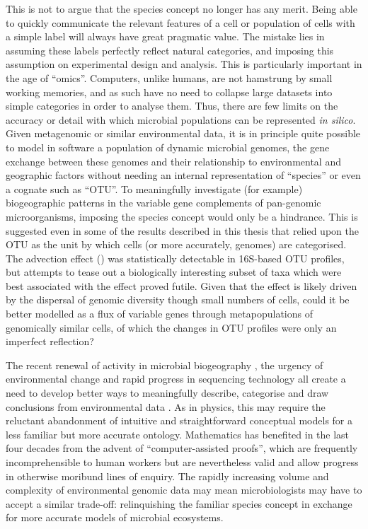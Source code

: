This is not to argue that the species concept no longer has any merit.
Being able to quickly communicate the relevant features of a cell or population of cells with a simple label will always have great pragmatic value.
The mistake lies in assuming these labels perfectly reflect natural categories, and imposing this assumption on experimental design and analysis.
This is particularly important in the age of ``omics''.
Computers, unlike humans, are not hamstrung by small working memories, and as such have no need to collapse large datasets into simple categories in order to analyse them.
Thus, there are few limits on the accuracy or detail with which microbial populations can be represented \textit{in silico}. 
Given metagenomic or similar environmental data, it is in principle quite possible to model in software a population of dynamic microbial genomes, the gene exchange between these genomes and their relationship to environmental and geographic factors without needing an internal representation of ``species'' or even a cognate such as ``\ac{OTU}''.
To meaningfully investigate (for example) biogeographic patterns in the variable gene complements of pan-genomic microorganisms, imposing the species concept would only be a hindrance.
This is suggested even in some of the results described in this thesis that relied upon the \ac{OTU} as the unit by which cells (or more accurately, genomes) are categorised.
The advection effect () was statistically detectable in 16S-based \ac{OTU} profiles, but attempts to tease out a biologically interesting subset of taxa which were best associated with the effect proved futile.
Given that the effect is likely driven by the dispersal of genomic diversity though small numbers of cells, could it be better modelled as a flux of variable genes through metapopulations of genomically similar cells, of which the changes in \ac{OTU} profiles were only an imperfect reflection?

The recent renewal of activity in microbial biogeography \cite{Ramette:2006jo}, the urgency of environmental change and rapid progress in sequencing technology all create a need to develop better ways to meaningfully describe, categorise and draw conclusions from environmental data \cite{Goldenfeld:2007im}.
As in physics, this may require the reluctant abandonment of intuitive and straightforward conceptual models for a less familiar but more accurate ontology.
Mathematics has benefited in the last four decades from the advent of ``computer-assisted proofs'', which are frequently incomprehensible to human workers but are nevertheless valid and allow progress in otherwise moribund lines of enquiry.
The rapidly increasing volume and complexity of environmental genomic data may mean microbiologists may have to accept a similar trade-off: relinquishing the familiar species concept in exchange for more accurate models of microbial ecosystems.

